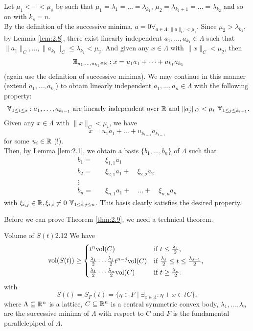 \documentclass{Vorlesungstemplate_English} %
\begin{document}
    \begin{pf}
      Let $\mu_1<\cdots<\mu_s$ be such that $\mu_1 = \lambda_1 = \dots = \lambda_{k_1}$, $\mu_2 = \lambda_{k_1+1} = \dots = \lambda_{k_2}$ and so on with $k_s = n$. \\
      By the definition of the successive minima, $a = 0\forall_{a \in \Lambda: \|a\|_C < \mu_1}$. Since $\mu_2 > \lambda_{k_1}$, by Lemma \ref{lem:2.8}, there exist linearly independent $a_1, \dots, a_{k_1} \in \Lambda$ such that $\|a_1\|_C, \dots, \|a_{k_1}\|_C \leq \lambda_{k_1} < \mu_2$. And given any $x \in \Lambda$ with $\|x\|_C < \mu_2$, then
      \[ \exists_{u_1, \dots, u_{k_1} \in \R}: x = u_1a_1 + \dots + u_{k_1}a_{k_1}\]
      (again use the definition of successive minima). We may continue in this manner (extend $a_1, \dots, a_{k_1}$) to obtain linearly independent $a_1, \dots, a_n \in \Lambda$ with the following property:
      \[ \forall_{1 \leq t \leq s}: a_1, \dots, a_{k_{t-1}} \text{ are linearly independent over }\R \text{ and } \|a_j\|_C < \mu_t \forall_{1 \leq j \leq k_{t-1}}.\]
      Given any $x \in \Lambda$ with $\|x\|_C < \mu_t$, we have
      \[ x = u_1a_1 + \dots + u_{k_{t-1}}a_{k_{t-1}}\]
      for some $u_i \in \mathbb{R}$ (!). \\
      Then, by Lemma \ref{lem:2.1}, we obtain a basis $\{ b_1, \dots, b_n\}$ of $\Lambda$ such that
      \begin{align*}
        b_1 = \quad & \xi_{1,1}a_1 \\
        b_2 = \quad & \xi_{2,1}a_1 + \quad  \xi_{2,2}a_2 \\
        \vdots \qquad \ & \\
        b_n = \quad & \xi_{n,1}a_1 + \quad  \dots + \quad  \xi_{n,n}a_n
      \end{align*}
      with $\xi_{i,j} \in \R, \xi_{i,i} \neq 0 \forall_{1 \leq i,j \leq n}$. This basis clearly satisfies the desired property.
    \end{pf}
    \noindent Before we can prove Theorem \ref{thm:2.9}, we need a technical theorem.
    \begin{theorem}{Volume of $S(t)$}{2.12}
        We have
        \begin{equation*}
            \vol(S(t)) \ge
            \begin{cases*}
                t^n \vol(C) & if \(t \le \frac{\lambda_1}{2}\), \\
                \frac{\lambda_1}{2} \dotsm \frac{\lambda_j}{2} t^{n-j} \vol(C) & if \(\frac{\lambda_j}{2} \le t \le \frac{\lambda_{j+1}}{2}\), \\
                \frac{\lambda_1}{2} \dotsm \frac{\lambda_n}{2} \vol(C) & if \(t \ge \frac{\lambda_n}{2}\).
            \end{cases*}
        \end{equation*}
        with
        \[ S(t) = S_F(t) = \{ \eta \in F \mid \exists_{x \in \Lambda}:\eta+x \in tC\},\]
        where $\Lambda \subseteq \mathbb{R}^n$ is a lattice, $C \subseteq \mathbb{R}^n$ is a central symmetric convex body, $\lambda_1, \dots, \lambda_n$ are the successive minima of $\Lambda$ with respect to $C$ and $F$ is the fundamental parallelepiped of $\Lambda$.
    \end{theorem}
\end{document}
